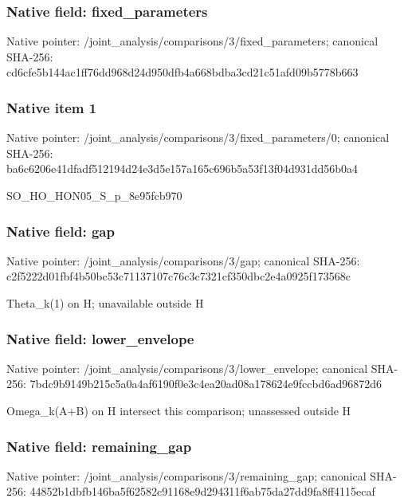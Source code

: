 \documentclass[10pt,a4paper]{article}
\begin{document}
\subsubsection{Native field: fixed\_\allowbreak{}parameters}
Native pointer: /joint\_\allowbreak{}analysis/comparisons/3/fixed\_\allowbreak{}parameters; canonical SHA-256: cd6cfe5b144ac1ff76dd968d24d950dfb4a668bdba3cd21c51afd09b5778b663

\subsubsection{Native item 1}
Native pointer: /joint\_\allowbreak{}analysis/comparisons/3/fixed\_\allowbreak{}parameters/0; canonical SHA-256: ba6c6206e41dfadf512194d24e3d5e157a165c696b5a53f13f04d931dd56b0a4

\begingroup\raggedright\sloppy SO\_\allowbreak{}HO\_\allowbreak{}HON05\_\allowbreak{}S\_\allowbreak{}p\_\allowbreak{}8e95fcb970\par\endgroup

\subsubsection{Native field: gap}
Native pointer: /joint\_\allowbreak{}analysis/comparisons/3/gap; canonical SHA-256: c2f5222d01fbf4b50bc53c71137107c76c3c7321cf350dbc2e4a0925f173568c

\begingroup\raggedright\sloppy Theta\_\allowbreak{}k(1) on H;\allowbreak{} unavailable outside H\par\endgroup

\subsubsection{Native field: lower\_\allowbreak{}envelope}
Native pointer: /joint\_\allowbreak{}analysis/comparisons/3/lower\_\allowbreak{}envelope; canonical SHA-256: 7bdc9b9149b215c5a0a4af6190f0e3c4ea20ad08a178624e9fccbd6ad96872d6

\begingroup\raggedright\sloppy Omega\_\allowbreak{}k(A+B) on H intersect this comparison;\allowbreak{} unassessed outside H\par\endgroup

\subsubsection{Native field: remaining\_\allowbreak{}gap}
Native pointer: /joint\_\allowbreak{}analysis/comparisons/3/remaining\_\allowbreak{}gap; canonical SHA-256: 44852b1dbfb146ba5f62582c91168e9d294311f6ab75da27dd9fa8ff4115ecaf
\end{document}

